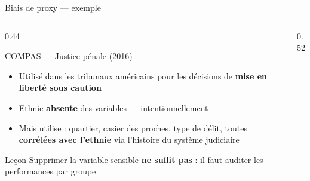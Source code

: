 \documentclass[aspectratio=169, 10pt]{beamer}
\begin{document}
\begin{frame}{Biais de proxy --- exemple}
  \begin{columns}[T]
    \begin{column}{0.44\textwidth}
      \begin{alertblock}{COMPAS --- Justice pénale (2016)}
        \begin{itemize}
          \item Utilisé dans les tribunaux américains pour
                les décisions de \textbf{mise en liberté sous caution}
          \item Ethnie \textbf{absente} des variables — intentionnellement
          \item Mais utilise : quartier, casier des proches, type de délit,
                toutes \textbf{corrélées avec l'ethnie} via l'histoire
                du système judiciaire
        \end{itemize}
      \end{alertblock}
      \begin{exampleblock}{Leçon}
        Supprimer la variable sensible \textbf{ne suffit pas} :
        il faut auditer les performances par groupe
      \end{exampleblock}
    \end{column}
    \begin{column}{0.52\textwidth}
      \begin{center}
      \end{center}
    \end{column}
  \end{columns}
\end{frame}
\end{document}
